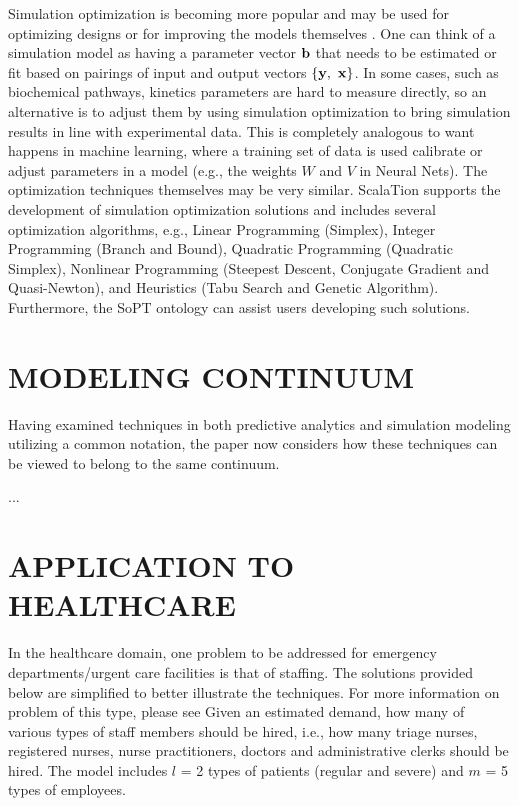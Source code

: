 \documentclass{wscpaperproc}
\theoremstyle{wsc}
\begin{document}
Simulation optimization is becoming more popular
and may be used for optimizing designs or for improving the
models themselves .
One can think of a simulation model as having a parameter vector ${\bf b}$ that
needs to be estimated or fit based on pairings of input and output
vectors $\{{\bf y}, ~ {\bf x}\}$.
In some cases, such as biochemical pathways, kinetics parameters
are hard to measure directly, so an alternative is to adjust
them by using simulation optimization to bring simulation
results in line with experimental data.
This is completely analogous to want happens in machine learning, where
a training set of data is used calibrate or adjust parameters in a model
(e.g., the weights $W$ and $V$ in Neural Nets).
The optimization techniques themselves may be very similar.
ScalaTion supports the development of simulation optimization solutions
and includes several optimization algorithms, e.g.,
Linear Programming (Simplex),
Integer Programming (Branch and Bound),
Quadratic Programming (Quadratic Simplex),
Nonlinear Programming (Steepest Descent, Conjugate Gradient and Quasi-Newton), and
Heuristics (Tabu Search and Genetic Algorithm).
Furthermore, the SoPT ontology  can assist users
developing such solutions.

\section{MODELING CONTINUUM}

Having examined techniques in both predictive analytics and
simulation modeling utilizing a common notation, the paper now
considers how these techniques can be viewed to belong to the same continuum.

...

\section{APPLICATION TO HEALTHCARE}

In the healthcare domain,
one problem to be addressed for emergency departments/urgent care facilities
is that of staffing.
The solutions provided below are simplified to better illustrate the techniques.
For more information on problem of this type, please see 
Given an estimated demand, how many of various types of staff members should be hired, i.e., how many
triage nurses, registered nurses, nurse practitioners, doctors and administrative clerks
should be hired.
The model includes $l$ = 2 types of patients (regular and severe) and $m$ = 5 types of employees.
\end{document}
